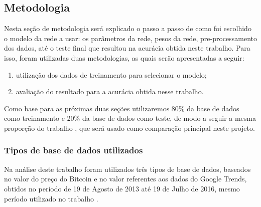 \subsection{Metodologia}
\label{sec:metodologia}
Nesta seção de metodologia será explicado o passo a passo de como foi escolhido o modelo da rede a usar: os parâmetros da rede, pesos da rede, pre-processamento dos dados, até o teste final que resultou na acurácia obtida neste trabalho. Para isso, foram utilizadas duas metodologias, as quais serão apresentadas a seguir: 
\begin{enumerate}
\item utilização dos dados de treinamento para selecionar o modelo; 
\item avaliação do resultado para a acurácia obtida nesse trabalho.
\end{enumerate}

Como base para as próximas duas seções utilizaremos 80\% da base de dados como treinamento e 20\% da base de dados como teste, de modo a seguir a mesma proporção do trabalho \cite{mcnally2016predicting}, que será usado como comparação principal neste projeto.

\subsubsection{Tipos de base de dados utilizados}
\label{sec:metobase}
Na análise deste trabalho foram utilizados três tipos de base de dados, baseados no valor do preço do Bitcoin e no valor referentes aos dados do Google Trends, obtidos no período de 19 de Agosto de 2013 até 19 de Julho de 2016, mesmo período utilizado no trabalho \cite{mcnally2016predicting}.

